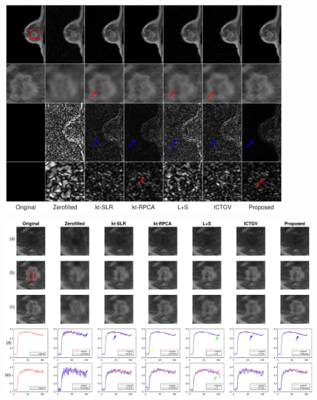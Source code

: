 \documentclass{beamer}
\begin{document}

\begin{frame}
\begin{minipage}{1\textwidth}
\centering
\includegraphics[width=0.9\textwidth]{../img/tgvnn/figure5_breast1.eps}
\label{fig:breast1}
\end{minipage} 
\end{frame}

\begin{frame}
\hspace{-0.9cm}
	\begin{minipage}{1\textwidth}
\centering
\includegraphics[width=1.15\textwidth]{../img/tgvnn/figure6_breast1_frames.eps}
\label{fig:breast1_time}
\end{minipage}
\end{frame}
\end{document}

